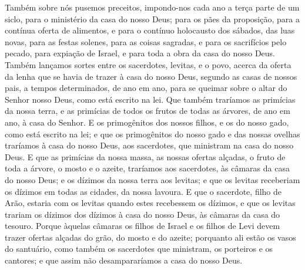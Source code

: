Também sobre nós pusemos preceitos, impondo-nos cada ano a terça
parte de um siclo, para o ministério da casa do nosso Deus;
para os pães da proposição, para a contínua oferta de
alimentos, e para o contínuo holocausto dos sábados, das luas novas,
para as festas solenes, para as coisas sagradas, e para os
sacrifícios pelo pecado, para expiação de Israel, e para toda a obra
da casa do nosso Deus. Também lançamos sortes entre os
sacerdotes, levitas, e o povo, acerca da oferta da lenha que se
havia de trazer à casa do nosso Deus, segundo as casas de nossos
pais, a tempos determinados, de ano em ano, para se queimar sobre o
altar do Senhor nosso Deus, como está escrito na lei. Que
também traríamos as primícias da nossa terra, e as primícias de
todos os frutos de todas as árvores, de ano em ano, à casa do
Senhor. E os primogênitos dos nossos filhos, e os do nosso
gado, como está escrito na lei; e que os primogênitos do nosso gado
e das nossas ovelhas traríamos à casa do nosso Deus, aos sacerdotes,
que ministram na casa do nosso Deus. E que as primícias da
nossa massa, as nossas ofertas alçadas, o fruto de toda a árvore, o
mosto e o azeite, traríamos aos sacerdotes, às câmaras da casa do
nosso Deus; e os dízimos da nossa terra aos levitas; e que os
levitas receberiam os dízimos em todas as cidades, da nossa lavoura.
E que o sacerdote, filho de Arão, estaria com os levitas
quando estes recebessem os dízimos, e que os levitas trariam os
dízimos dos dízimos à casa do nosso Deus, às câmaras da casa do
tesouro. Porque àquelas câmaras os filhos de Israel e os
filhos de Levi devem trazer ofertas alçadas do grão, do mosto e do
azeite; porquanto ali estão os vasos do santuário, como também os
sacerdotes que ministram, os porteiros e os cantores; e que assim
não desampararíamos a casa do nosso Deus.

\medskip

